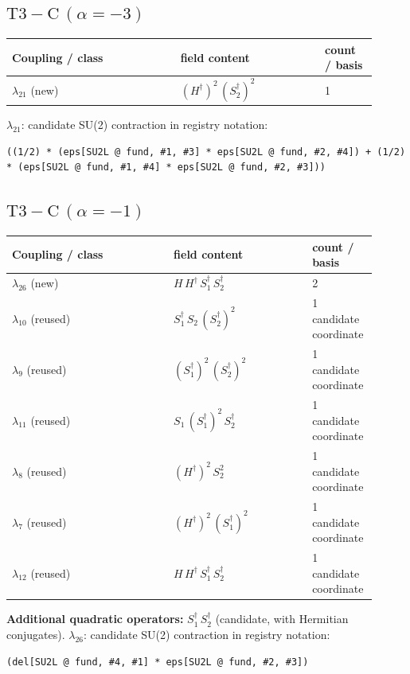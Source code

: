 \documentclass[9pt,a4paper]{article}
\begin{document}
\subsection*{$ \mathrm{T3-C}\,(\alpha=-3) $}
\begin{longtable}{@{}p{0.42\linewidth}p{0.36\linewidth}p{0.13\linewidth}@{}}
\toprule
Coupling / class & field content & count / basis\\
\midrule
\endhead
$\lambda_{21}$ (new) & $\left(H^\dagger\right)^{2}\, \left(S_2^\dagger\right)^{2}$ & 1 \\
\bottomrule
\end{longtable}
\textbf{$ \lambda_{21} $}: candidate SU(2) contraction in registry notation:
\begin{lstlisting}[mathescape=true]
((1/2) * (eps[SU2L @ fund, #1, #3] * eps[SU2L @ fund, #2, #4]) + (1/2) * (eps[SU2L @ fund, #1, #4] * eps[SU2L @ fund, #2, #3]))
\end{lstlisting}

\subsection*{$ \mathrm{T3-C}\,(\alpha=-1) $}
\begin{longtable}{@{}p{0.42\linewidth}p{0.36\linewidth}p{0.13\linewidth}@{}}
\toprule
Coupling / class & field content & count / basis\\
\midrule
\endhead
$\lambda_{26}$ (new) & $H\, H^\dagger\, S_1^\dagger\, S_2^\dagger$ & 2 \\
$\lambda_{10}$ (reused) & $S_1^\dagger\, S_2\, \left(S_2^\dagger\right)^{2}$ & 1 candidate coordinate \\
$\lambda_{9}$ (reused) & $\left(S_1^\dagger\right)^{2}\, \left(S_2^\dagger\right)^{2}$ & 1 candidate coordinate \\
$\lambda_{11}$ (reused) & $S_1\, \left(S_1^\dagger\right)^{2}\, S_2^\dagger$ & 1 candidate coordinate \\
$\lambda_{8}$ (reused) & $\left(H^\dagger\right)^{2}\, S_2^{2}$ & 1 candidate coordinate \\
$\lambda_{7}$ (reused) & $\left(H^\dagger\right)^{2}\, \left(S_1^\dagger\right)^{2}$ & 1 candidate coordinate \\
$\lambda_{12}$ (reused) & $H\, H^\dagger\, S_1^\dagger\, S_2^\dagger$ & 1 candidate coordinate \\
\bottomrule
\end{longtable}
\textbf{Additional quadratic operators:}
$S_1^\dagger\, S_2^\dagger$ (candidate, with Hermitian conjugates).
\textbf{$ \lambda_{26} $}: candidate SU(2) contraction in registry notation:
\begin{lstlisting}[mathescape=true]
(del[SU2L @ fund, #4, #1] * eps[SU2L @ fund, #2, #3])
\end{lstlisting}
\end{document}
